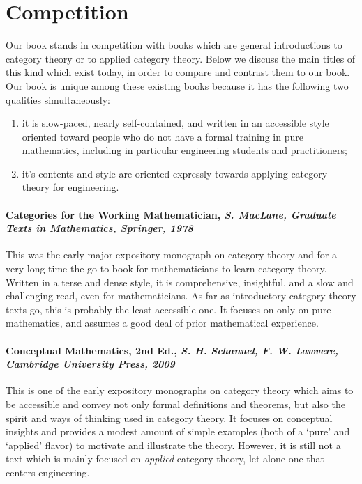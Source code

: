 \documentclass[10pt, article, one side]{memoir}
\begin{document}
    \section{Competition}
    \label{sec:competition}

    Our book stands in competition with books which are general introductions to category theory or to applied category theory.
    Below we discuss the main titles of this kind which exist today, in order to compare and contrast them to our book.
    Our book is unique among these existing books because it has the following two qualities simultaneously:
    \begin{enumerate}
        \item it is slow-paced, nearly self-contained, and written in an accessible style oriented toward people who do not have a formal training in pure mathematics, including in particular engineering students and practitioners;
        \item it's contents and style are oriented expressly towards applying category theory for engineering.
    \end{enumerate}

    \paragraph{Categories for the Working Mathematician, \emph{S.
            MacLane, Graduate Texts in Mathematics, Springer, 1978}}

    This was the early major expository monograph on category theory and for a very long time the go-to book for mathematicians to learn category theory.
    Written in a terse and dense style, it is comprehensive, insightful, and a slow and challenging read, even for mathematicians.
    As far as introductory category theory texts go, this is probably the least accessible one.
    It focuses on only on pure mathematics, and assumes a good deal of prior mathematical experience.

    \paragraph{Conceptual Mathematics, 2nd Ed., \emph{S.
            H.
            Schanuel, F.
            W.
            Lawvere, Cambridge University Press, 2009}}

    This is one of the early expository monographs on category theory which aims to be accessible and convey not only formal definitions and theorems, but also the spirit and ways of thinking used in category theory.
    It focuses on conceptual insights and provides a modest amount of simple examples (both of a `pure' and `applied' flavor) to motivate and illustrate the theory.
    However, it is still not a text which is mainly focused on \emph{applied} category theory, let alone one that centers engineering.
\end{document}
